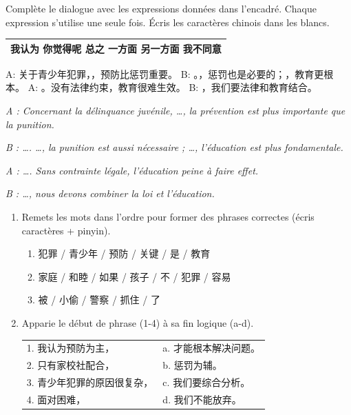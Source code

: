 \documentclass[11pt]{article}
\begin{document}
\begin{exercice}
Complète le dialogue avec les expressions données dans l'encadré. Chaque expression s'utilise une seule fois. Écris les caractères chinois dans les blancs.
\begin{center}
\begin{tabular}{|c|}
\hline
\textbf{我认为 \quad 你觉得呢 \quad 总之 \quad 一方面 \quad 另一方面 \quad 我不同意} \\
\hline
\end{tabular}
\end{center}
\begin{textebox}
A: 关于青少年犯罪，\underline{\hspace{3cm}}，预防比惩罚重要。
B: \underline{\hspace{3cm}}。\underline{\hspace{3cm}}，惩罚也是必要的；\underline{\hspace{3cm}}，教育更根本。
A: \underline{\hspace{3cm}}。没有法律约束，教育很难生效。
B: \underline{\hspace{3cm}}，我们要法律和教育结合。
\par\emph{A : Concernant la délinquance juvénile, \dots, la prévention est plus importante que la punition.}
\par\emph{B : \dots . \dots, la punition est aussi nécessaire ; \dots, l'éducation est plus fondamentale.}
\par\emph{A : \dots . Sans contrainte légale, l'éducation peine à faire effet.}
\par\emph{B : \dots, nous devons combiner la loi et l'éducation.}
\end{textebox}
\end{exercice}

\begin{exercice}
\begin{enumerate}
    \item Remets les mots dans l'ordre pour former des phrases correctes (écris caractères + pinyin).
    \begin{enumerate}
        \item 犯罪 / 青少年 / 预防 / 关键 / 是 / 教育
        \item 家庭 / 和睦 / 如果 / 孩子 / 不 / 犯罪 / 容易
        \item 被 / 小偷 / 警察 / 抓住 / 了
    \end{enumerate}
    \item Apparie le début de phrase (1-4) à sa fin logique (a-d).
    \begin{tabular}{ll}
    1. 我认为预防为主， & a. 才能根本解决问题。 \\
    2. 只有家校社配合， & b. 惩罚为辅。 \\
    3. 青少年犯罪的原因很复杂， & c. 我们要综合分析。 \\
    4. 面对困难， & d. 我们不能放弃。 \\
    \end{tabular}
\end{enumerate}
\end{exercice}
\end{document}
